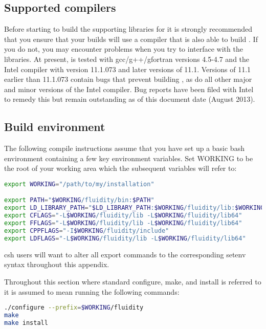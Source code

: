 \subsection{Supported compilers}
\label{sec:required_libraries_supported_compilers}

Before starting to build the supporting libraries for \fluidity it is strongly
recommended that you ensure that your builds will use a compiler that is also
able to build \fluidity. If you do not, you may encounter problems when you try
to interface \fluidity with the libraries. At present, \fluidity is tested with
gcc/g++/gfortran versions 4.5-4.7 and the Intel compiler with version 11.1.073
and later versions of 11.1. Versions of 11.1 earlier than 11.1.073 contain bugs
that prevent building \fluidity, as do all other major and minor versions of
the Intel compiler. Bug reports have been filed with Intel to remedy this but 
remain outstanding as of this document date (August 2013).

\subsection{Build environment}
\label{sec:required_libraries_build_environment}

The following compile instructions assume that you have set up a basic bash
environment containing a few key environment variables. Set WORKING to be the
root of your working area which the subsequent variables will refer to:

\begin{lstlisting}[language=bash]
export WORKING="/path/to/my/installation"

export PATH="$WORKING/fluidity/bin:$PATH"
export LD_LIBRARY_PATH="$LD_LIBRARY_PATH:$WORKING/fluidity/lib:$WORKING/fluidity/lib64"
export CFLAGS="-L$WORKING/fluidity/lib -L$WORKING/fluidity/lib64"
export FFLAGS="-L$WORKING/fluidity/lib -L$WORKING/fluidity/lib64"
export CPPFLAGS="-I$WORKING/fluidity/include"
export LDFLAGS="-L$WORKING/fluidity/lib -L$WORKING/fluidity/lib64"
\end{lstlisting}

csh users will want to alter all export commands to the corresponding setenv
syntax throughout this appendix.

Throughout this section where standard configure, make, and install is referred
to it is assumed to mean running the following commands:

\begin{lstlisting}[language=bash]
./configure --prefix=$WORKING/fluidity
make
make install
\end{lstlisting}


